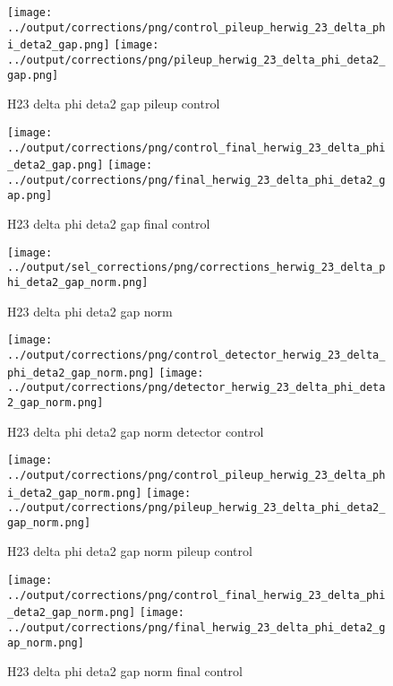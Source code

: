 \documentclass[11pt]{book}
\begin{document}
\begin{figure}[ht]
\centering
\texttt{[image: ../output/corrections/png/control\_pileup\_herwig\_23\_delta\_phi\_deta2\_gap.png]}
\texttt{[image: ../output/corrections/png/pileup\_herwig\_23\_delta\_phi\_deta2\_gap.png]}
\caption{H23 delta phi deta2 gap pileup control}
\label{fig:H23_delta_phi_deta2_gap_pileup_control}
\end{figure}


\begin{figure}[ht]
\centering
\texttt{[image: ../output/corrections/png/control\_final\_herwig\_23\_delta\_phi\_deta2\_gap.png]}
\texttt{[image: ../output/corrections/png/final\_herwig\_23\_delta\_phi\_deta2\_gap.png]}
\caption{H23 delta phi deta2 gap final control}
\label{fig:H23_delta_phi_deta2_gap_final_control}
\end{figure}

\begin{figure}[ht]
\centering
\texttt{[image: ../output/sel\_corrections/png/corrections\_herwig\_23\_delta\_phi\_deta2\_gap\_norm.png]}
\caption{H23 delta phi deta2 gap norm}
\label{fig:H23_delta_phi_deta2_gap_norm}
\end{figure}

\begin{figure}[ht]
\centering
\texttt{[image: ../output/corrections/png/control\_detector\_herwig\_23\_delta\_phi\_deta2\_gap\_norm.png]}
\texttt{[image: ../output/corrections/png/detector\_herwig\_23\_delta\_phi\_deta2\_gap\_norm.png]}
\caption{H23 delta phi deta2 gap norm detector control}
\label{fig:H23_delta_phi_deta2_gap_norm_detector_control}
\end{figure}

\begin{figure}[ht]
\centering
\texttt{[image: ../output/corrections/png/control\_pileup\_herwig\_23\_delta\_phi\_deta2\_gap\_norm.png]}
\texttt{[image: ../output/corrections/png/pileup\_herwig\_23\_delta\_phi\_deta2\_gap\_norm.png]}
\caption{H23 delta phi deta2 gap norm pileup control}
\label{fig:H23_delta_phi_deta2_gap_norm_pileup_control}
\end{figure}


\begin{figure}[ht]
\centering
\texttt{[image: ../output/corrections/png/control\_final\_herwig\_23\_delta\_phi\_deta2\_gap\_norm.png]}
\texttt{[image: ../output/corrections/png/final\_herwig\_23\_delta\_phi\_deta2\_gap\_norm.png]}
\caption{H23 delta phi deta2 gap norm final control}
\label{fig:H23_delta_phi_deta2_gap_norm_final_control}
\end{figure}
\end{document}
